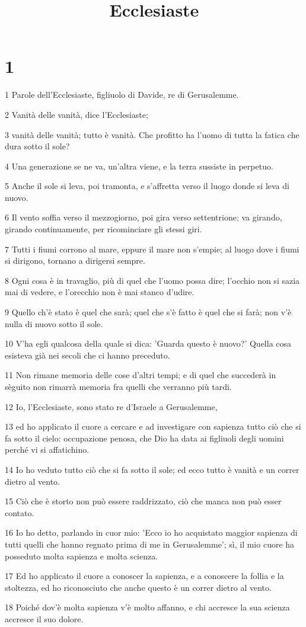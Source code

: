 

\title{Ecclesiaste}


\chapter{1}

\par 1 Parole dell'Ecclesiaste, figliuolo di Davide, re di Gerusalemme.
\par 2 Vanità delle vanità, dice l'Ecclesiaste;
\par 3 vanità delle vanità; tutto è vanità. Che profitto ha l'uomo di tutta la fatica che dura sotto il sole?
\par 4 Una generazione se ne va, un'altra viene, e la terra sussiste in perpetuo.
\par 5 Anche il sole si leva, poi tramonta, e s'affretta verso il luogo donde si leva di nuovo.
\par 6 Il vento soffia verso il mezzogiorno, poi gira verso settentrione; va girando, girando continuamente, per ricominciare gli stessi giri.
\par 7 Tutti i fiumi corrono al mare, eppure il mare non s'empie; al luogo dove i fiumi si dirigono, tornano a dirigersi sempre.
\par 8 Ogni cosa è in travaglio, più di quel che l'uomo possa dire; l'occhio non si sazia mai di vedere, e l'orecchio non è mai stanco d'udire.
\par 9 Quello ch'è stato è quel che sarà; quel che s'è fatto è quel che si farà; non v'è nulla di nuovo sotto il sole.
\par 10 V'ha egli qualcosa della quale si dica: 'Guarda questo è nuovo?' Quella cosa esisteva già nei secoli che ci hanno preceduto.
\par 11 Non rimane memoria delle cose d'altri tempi; e di quel che succederà in sèguito non rimarrà memoria fra quelli che verranno più tardi.
\par 12 Io, l'Ecclesiaste, sono stato re d'Israele a Gerusalemme,
\par 13 ed ho applicato il cuore a cercare e ad investigare con sapienza tutto ciò che si fa sotto il cielo: occupazione penosa, che Dio ha data ai figliuoli degli uomini perché vi si affatichino.
\par 14 Io ho veduto tutto ciò che si fa sotto il sole; ed ecco tutto è vanità e un correr dietro al vento.
\par 15 Ciò che è storto non può essere raddrizzato, ciò che manca non può esser contato.
\par 16 Io ho detto, parlando in cuor mio: 'Ecco io ho acquistato maggior sapienza di tutti quelli che hanno regnato prima di me in Gerusalemme'; sì, il mio cuore ha posseduto molta sapienza e molta scienza.
\par 17 Ed ho applicato il cuore a conoscer la sapienza, e a conoscere la follia e la stoltezza, ed ho riconosciuto che anche questo è un correr dietro al vento.
\par 18 Poiché dov'è molta sapienza v'è molto affanno, e chi accresce la sua scienza accresce il suo dolore.

